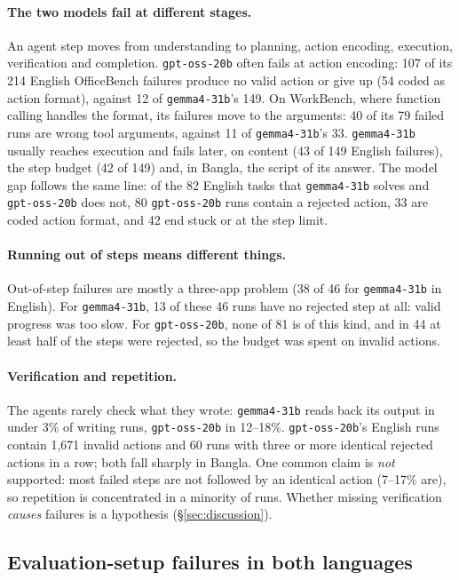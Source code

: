 \documentclass[11pt]{article}
\newcommand{\gemma}{\texttt{gemma4-31b}}
\newcommand{\gptoss}{\texttt{gpt-oss-20b}}
\newcommand{\OB}{OfficeBench}
\newcommand{\WB}{WorkBench}
\begin{document}
\paragraph{The two models fail at different stages.} An agent step moves from understanding to
planning, action encoding, execution, verification and completion. \gptoss{} often fails at
action encoding: 107 of its 214 English \OB{} failures produce no valid action or give up (54
coded as action format), against 12 of \gemma{}'s 149. On \WB{}, where function calling handles
the format, its failures move to the arguments: 40 of its 79 failed runs are wrong tool arguments,
against 11 of \gemma{}'s 33. \gemma{} usually reaches execution and fails later, on content (43 of
149 English failures), the step budget (42 of 149) and, in Bangla, the script of its answer.
The model gap follows the same line: of the 82 English tasks that \gemma{} solves and \gptoss{}
does not, 80 \gptoss{} runs contain a rejected action, 33 are coded action format, and 42 end
stuck or at the step limit.

\paragraph{Running out of steps means different things.} Out-of-step failures are mostly a
three-app problem (38 of 46 for \gemma{} in English). For \gemma{}, 13 of these 46 runs have no
rejected step at all: valid progress was too slow. For \gptoss{}, none of 81 is of this kind, and in
44 at least half of the steps were rejected, so the budget was spent on invalid actions.

\paragraph{Verification and repetition.} The agents rarely check what they wrote: \gemma{} reads
back its output in under 3\% of writing runs, \gptoss{} in 12--18\%. \gptoss{}'s English runs
contain 1{,}671 invalid actions and 60 runs with three or more identical rejected actions in a row;
both fall sharply in Bangla. One common claim is \emph{not} supported: most failed steps are not
followed by an identical action (7--17\% are), so repetition is concentrated in a minority of runs.
Whether missing verification \emph{causes} failures is a hypothesis (\S\ref{sec:discussion}).

\subsection{Evaluation-setup failures in both languages}
\label{sec:setup}
\end{document}
